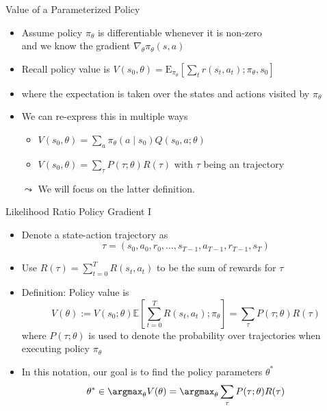 \documentclass[aspectratio=169]{../latex_main/tntbeamer}  %
\begin{document}
\begin{frame}[c]{Value of a Parameterized Policy}

\begin{itemize}
	\item Assume policy $\pi_\theta$ is differentiable whenever it is non-zero\\
	 and we know the gradient $\nabla_\theta \pi_\theta (s,a)$
	\item Recall policy value is $V(s_0, \theta) = \mathrm{E}_{\pi_\theta}\left[ \sum_{t} r(s_t, a_t); \pi_\theta, s_0 \right]$
	\item where the expectation is taken over the states and actions visited by $\pi_\theta$
	\item We can re-express this in multiple ways
	\begin{itemize}
	    \item $V(s_0,\theta) = \sum_a \pi_\theta (a \mid s_0) Q(s_0, a; \theta)$
	    \item $V(s_0, \theta) = \sum_\tau P(\tau; \theta) R(\tau)$ with $\tau$ being an trajectory
	\end{itemize}
	\item[$\leadsto$] We will focus on the latter definition.
\end{itemize}

\end{frame}
\begin{frame}[c]{Likelihood Ratio Policy Gradient I }
	
	\begin{itemize}
		\item Denote a state-action trajectory as 
		$$ \tau = (s_0, a_0, r_0, \ldots, s_{T-1}, a_{T-1}, r_{T-1}, s_T) $$
		\item Use $R(\tau) = \sum_{t=0}^{T} R(s_t, a_t)$ to be the sum of rewards for $\tau$
		\item Definition: Policy value is 
		$$V(\theta) := V(s_0;\theta) \mathbb{E}\left[\sum_{t=0}^T R(s_t, a_t); \pi_\theta \right] = \sum_{\tau} P(\tau; \theta)R(\tau) $$
		where $P(\tau; \theta)$ is used to denote the probability over trajectories when executing policy $\pi_\theta$
		\item In this notation, our goal is to find the policy parameters $\theta^*$
		$$\theta^* \in \argmax_{\theta} V(\theta) = \argmax_{\theta}\sum_{\tau} P(\tau; \theta) R(\tau) $$
		
	\end{itemize}
	
\end{frame}
\end{document}

